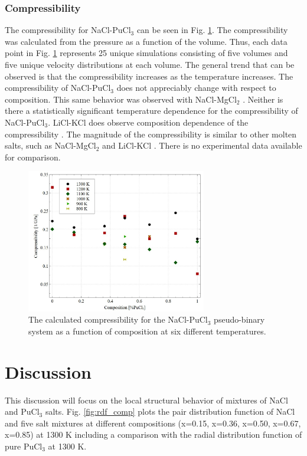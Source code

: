 \documentclass[review]{elsarticle}
\begin{document}
\FloatBarrier
\subsubsection{Compressibility}
The compressibility for NaCl-PuCl$_3$ can be seen in Fig. \ref{fig:compressibility}. The compressibility was calculated from the pressure as a function of the volume. Thus, each data point in Fig. \ref{fig:compressibility} represents 25 unique simulations consisting of five volumes and five unique velocity distributions at each volume. The general trend that can be observed is that the compressibility increases as the temperature increases. The compressibility of NaCl-PuCl$_3$ does not appreciably change with respect to composition. This same behavior was observed with NaCl-MgCl$_2$ \cite{duemmler_naclmgcl}. Neither is there a statistically significant temperature dependence for the compressibility of NaCl-PuCl$_3$. LiCl-KCl does observe composition dependence of the compressibility \cite{duemmler_liclkcl, Bengston2014}. The magnitude of the compressibility is similar to other molten salts, such as NaCl-MgCl$_2$ \cite{duemmler_naclmgcl} and LiCl-KCl \cite{duemmler_liclkcl, Bengston2014}. There is no experimental data available for comparison. 
\begin{figure}[h!]
 \centering
 \includegraphics[width=0.7\textwidth]{compressibility_no_fits.jpg} 
 \caption{The calculated compressibility for the NaCl-PuCl$_3$ pseudo-binary system as a function of composition at six different temperatures.}
 \label{fig:compressibility}
\end{figure} 
\FloatBarrier

\section{Discussion}
This discussion will focus on the local structural behavior of mixtures of NaCl and PuCl$_3$ salts. Fig. \ref{fig:rdf_comp} plots the pair distribution function of NaCl and five salt mixtures at different compositions (x=0.15, x=0.36, x=0.50, x=0.67, x=0.85) at 1300 K including a comparison with the radial distribution function of pure PuCl$_3$ at 1300 K.
\end{document}
